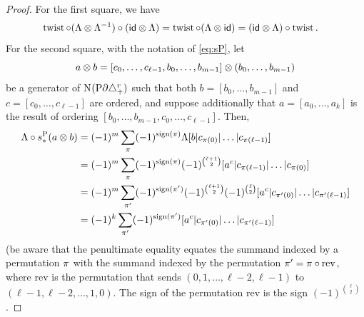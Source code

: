 \begin{proof}
	For the first square, we have
	\begin{align*}
		\operatorname{twist}\circ(\Lambda \otimes \Lambda^{-1})\circ (\mathsf{id}\otimes \Lambda)
		&=  \operatorname{twist}\circ(\Lambda \otimes \mathsf{id})
		=  (\mathsf{id}\otimes \Lambda) \circ \operatorname{twist}.
	\end{align*}
	For the second square, with the notation of \eqref{eq:sP}, let
	$$a\otimes b =  [c_0,\dots,c_{\ell-1},b_0,\dots,b_{m-1}]\otimes(b_0,\dots,b_{m-1})$$ 
	be a generator of $\operatorname{N}_{}({\operatorname{P}} \partial\triangle_{+}^{r})$ such that both $b=[b_0,\dots,b_{m-1}]$ and $c=[c_0,\dots,c_{\ell-1}]$ are ordered, and suppose additionally that $a = [a_0,\dots,a_k]$ is the result of ordering $[b_0,\dots,b_{m-1},c_0,\dots,c_{\ell-1}]$. Then,
	\begin{equation}\label{eq:lastsign}
		\begin{split}
			\Lambda\circ s_*^{{\operatorname{P}}} (a \otimes b)                                                        
			&= (-1)^{m}\sum_{\pi} (-1)^{\operatorname{sign}(\pi)} \Lambda[b|c_{\pi(0)}|\dots|c_{\pi(\ell-1)}]
			\\
			&= (-1)^{m} \sum_{\pi} (-1)^{\operatorname{sign}(\pi)} (-1)^{\binom{\ell+1}{2}} [a^c|c_{\pi(\ell-1)}|\dots|c_{\pi(0)}]
			\\
			&= (-1)^{m}\sum_{\pi'} (-1)^{\operatorname{sign}(\pi')} (-1)^{\binom{\ell+1}{2}} (-1)^{\binom{\ell}{2}} [a^c|c_{\pi'(0)}|\dots|c_{\pi'(\ell-1)}]
			\\
			&= (-1)^{k}\sum_{\pi'} (-1)^{\operatorname{sign}(\pi')} [a^c|c_{\pi'(0)}|\dots|c_{\pi'(\ell-1)}]
		\end{split}
	\end{equation}
	(be aware that the penultimate equality equates the summand indexed by a permutation $\pi$ with the summand indexed by the permutation $\pi' = \pi\circ \mathrm{rev}$, where $\mathrm{rev}$ is the permutation that sends $(0,1,\dots,\ell-2,\ell-1)$ to $(\ell-1,\ell-2,\dots,1,0)$. The sign of the permutation $\mathrm{rev}$ is the sign $(-1)^{\binom{\ell}{2}}$.


\end{proof}
